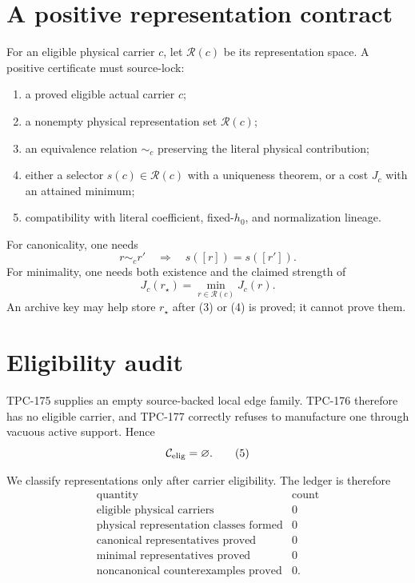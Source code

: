 \documentclass[11pt]{article}
\theoremstyle{definition}
\theoremstyle{remark}
\begin{document}
\section{A positive representation contract}

For an eligible physical carrier \(c\), let \(\mathcal R(c)\) be its
representation space.  A positive certificate must source-lock:

\begin{enumerate}
\item a proved eligible actual carrier \(c\);
\item a nonempty physical representation set \(\mathcal R(c)\);
\item an equivalence relation \(\sim_c\) preserving the literal
      physical contribution;
\item either a selector \(s(c)\in\mathcal R(c)\) with a uniqueness
      theorem, or a cost \(J_c\) with an attained minimum;
\item compatibility with literal coefficient, fixed-\(h_0\), and
      normalization lineage.
\end{enumerate}

For canonicality, one needs
\[
 r\sim_c r'\quad\Longrightarrow\quad s([r])=s([r']).              \tag{3}
\]
For minimality, one needs both existence and the claimed strength of
\[
 J_c(r_\star)=\min_{r\in\mathcal R(c)}J_c(r).                     \tag{4}
\]
An archive key may help store \(r_\star\) after (3) or (4) is proved;
it cannot prove them.

\section{Eligibility audit}

TPC-175 supplies an empty source-backed local edge family.  TPC-176
therefore has no eligible carrier, and TPC-177 correctly refuses to
manufacture one through vacuous active support.  Hence
\[
 \mathcal C_{\rm elig}=\varnothing.                               \tag{5}
\]

We classify representations only after carrier eligibility.  The
ledger is therefore
\[
\begin{array}{c|c}
\text{quantity}&\text{count}\\ \hline
\text{eligible physical carriers}&0\\
\text{physical representation classes formed}&0\\
\text{canonical representatives proved}&0\\
\text{minimal representatives proved}&0\\
\text{noncanonical counterexamples proved}&0 .
\end{array}                                                       \tag{6}
\]
\end{document}
